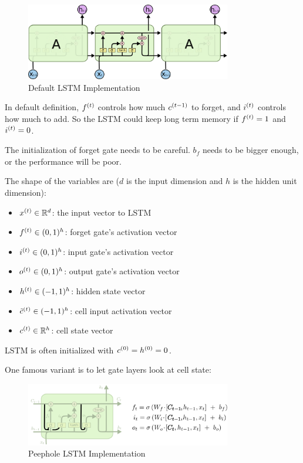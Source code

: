 \begin{definition}
\begin{figure}[H]
\includegraphics[width=0.8\textwidth]{machine_learning/pic/04/LSTM3-chain.png}
\centering
\caption{Default LSTM Implementation}
\end{figure}

\end{definition}


In default definition, ${f}^{(t)}$ controls how much ${c}^{(t-1)}$ to forget, and ${i}^{(t)}$ controls how much to add. So the LSTM could keep long term memory if ${f}^{(t)} = 1$ and ${i}^{(t)} = 0$.

The initialization of forget gate needs to be careful. $b_f$ needs to be bigger enough, or the performance will be poor.

The shape of the variables are ($d$ is the input dimension and $h$ is the hidden unit dimension):
\begin{itemize}
    \item ${x}^{(t)} \in \mathbb{R}^d$: the input vector to LSTM
    \item ${f}^{(t)} \in (0,1)^h$: forget gate's activation vector
    \item ${i}^{(t)} \in (0,1)^h$: input gate's activation vector
    \item ${o}^{(t)} \in (0,1)^h$: output gate's activation vector
    \item ${h}^{(t)} \in (-1,1)^h$: hidden state vector
    \item ${\tilde{c}}^{(t)} \in (-1,1)^h$: cell input activation vector
    \item ${c}^{(t)} \in \mathbb{R}^h$: cell state vector
\end{itemize}

LSTM is often initialized with ${c}^{(0)} = {h}^{(0)} = 0$.



\begin{definition}
    One famous variant is to let gate layers look at cell state:
    \begin{figure}[H]
\includegraphics[width=0.8\textwidth]{machine_learning/pic/04/LSTM3-var-peepholes.png}
\centering
\caption{Peephole LSTM Implementation}
\end{figure}
\end{definition}

